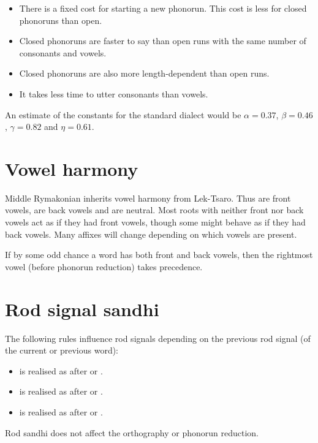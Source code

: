 \documentclass{book}
\newcommand{\lname}{Middle Rymakonian}
\begin{document}
\begin{itemize}
  \item There is a fixed cost for starting a new phonorun. This cost is less for closed phonoruns than open.
  \item Closed phonoruns are faster to say than open runs with the same number of consonants and vowels.
  \item Closed phonoruns are also more length-dependent than open runs.
  \item It takes less time to utter consonants than vowels.
\end{itemize}

An estimate of the constants for the standard dialect would be $\alpha = 0.37$, $\beta = 0.46$, $\gamma = 0.82$ and $\eta = 0.61$.

\section{Vowel harmony}

\lname{} inherits vowel harmony from Lek-Tsaro. Thus  are front vowels,  are back vowels and  are neutral. Most roots with neither front nor back vowels act as if they had front vowels, though some might behave as if they had back vowels. Many affixes will change depending on which vowels are present.

If by some odd chance a word has both front and back vowels, then the rightmost vowel (before phonorun reduction) takes precedence.

\section{Rod signal sandhi}

The following rules influence rod signals depending on the previous rod signal (of the current or previous word):

\begin{itemize}
    \item {} is realised as  after  or .
    \item {} is realised as  after  or .
    \item {} is realised as  after  or .
\end{itemize}

Rod sandhi does not affect the orthography or phonorun reduction.
\end{document}
